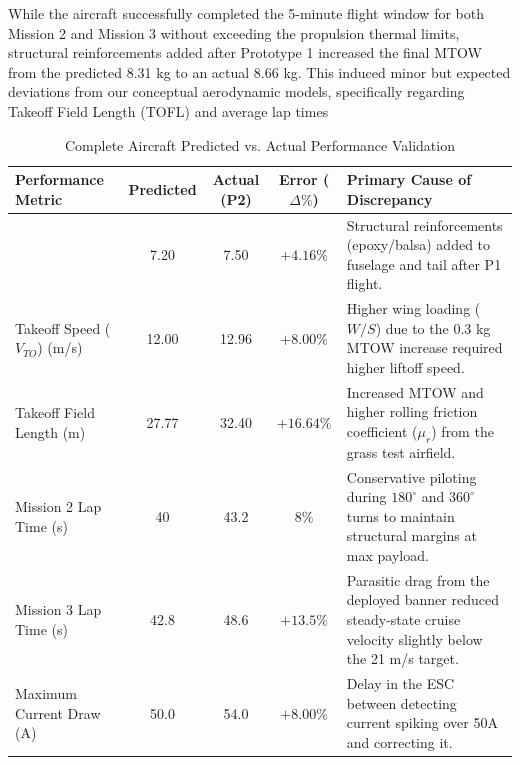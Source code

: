 \documentclass[10pt, letterpaper]{article}
\renewcommand{\arraystretch}{1.15} %
\begin{document}
While the aircraft successfully completed the 5-minute flight window for both Mission 2 and Mission 3 without exceeding the propulsion thermal limits, structural reinforcements added after Prototype 1 increased the final MTOW from the predicted 8.31 kg to an actual 8.66 kg. This induced minor but expected deviations from our conceptual aerodynamic models, specifically regarding Takeoff Field Length (TOFL) and average lap times

\begin{table}[htbp]
\centering
\renewcommand{\arraystretch}{1.3} %
\begin{tabular}{|>{\columncolor{db}}l|c|c|c|p{6cm}|}
\hline
\rowcolor{y}\textbf{{Performance Metric}} & \textbf{Predicted} & \textbf{Actual (P2)} & \textbf{Error ($\Delta\%$)} & \textbf{Primary Cause of Discrepancy} \\ \hline

{\color{gray!5}MTOW (Mission 2) (kg)} & 7.20 & 7.50 & $+4.16\%$ & Structural reinforcements (epoxy/balsa) added to fuselage and tail after P1 flight. \\ \hline

\color{gray!5}Takeoff Speed ($V_{TO}$) (m/s)} & 12.00 & 12.96 & $+8.00\%$ & Higher wing loading ($W/S$) due to the 0.3 kg MTOW increase required higher liftoff speed. \\ \hline

{\color{gray!5}Takeoff Field Length (m)} & 27.77 & 32.40 & $+16.64\%$ & Increased MTOW and higher rolling friction coefficient ($\mu_r$) from the grass test airfield. \\ \hline

{\color{gray!5}Mission 2 Lap Time (s)} & 40 & 43.2 & $8\%$ & Conservative piloting during $180^\circ$ and $360^\circ$ turns to maintain structural margins at max payload. \\ \hline

{\color{gray!5}Mission 3 Lap Time (s)} & 42.8 & 48.6 & $+13.5\%$ & Parasitic drag from the deployed banner reduced steady-state cruise velocity slightly below the 21 m/s target. \\ \hline

{\color{gray!5}Maximum Current Draw (A)} & 50.0 & 54.0 & $+8.00\%$ & Delay in the ESC between detecting current spiking over 50A and correcting it. \\ \hline
\end{tabular}
\caption{Complete Aircraft Predicted vs. Actual Performance Validation}
\label{tab:perf_validation}
\end{table}
\end{document}

